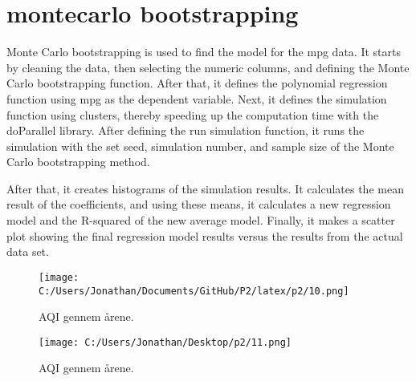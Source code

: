 

\section{montecarlo bootstrapping }

Monte Carlo bootstrapping is used to find the model for the mpg data. It starts by cleaning the data, then selecting the numeric columns, and defining the Monte Carlo bootstrapping function. After that, it defines the polynomial regression function using mpg as the dependent variable. Next, it defines the simulation function using clusters, thereby speeding up the computation time with the doParallel library. After defining the run simulation function, it runs the simulation with the set seed, simulation number, and sample size of the Monte Carlo bootstrapping method.

After that, it creates histograms of the simulation results. It calculates the mean result of the coefficients, and using these means, it calculates a new regression model and the R-squared of the new average model. Finally, it makes a scatter plot showing the final regression model results versus the results from the actual data set.



\begin{figure}[h] 
	\centering
	\texttt{[image: C:/Users/Jonathan/Documents/GitHub/P2/latex/p2/10.png]}
	\caption{AQI gennem årene.}
	\label{fig:j06}
\end{figure}

\begin{figure}[h] 
	\centering
	\texttt{[image: C:/Users/Jonathan/Desktop/p2/11.png]}
	\caption{AQI gennem årene.}
	\label{fig:j06}
\end{figure}